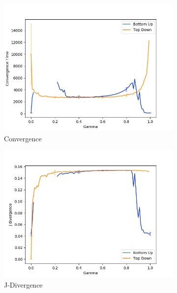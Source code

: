 \begin{figure}[H]
 \centering
  \begin{subfigure}[ht]{0.45\textwidth}
    \includegraphics[width=\textwidth]{Images/Figures/BU+TD/Spiteful/Convergence.png}
    \caption{Convergence}
 \end{subfigure}
 \hfill
 \begin{subfigure}[ht]{0.45\textwidth}
    \includegraphics[width=\textwidth]{Images/Figures/BU+TD/Spiteful/J-Div.png}
    \caption{J-Divergence}
 \end{subfigure}
 \hfill
 \begin{subfigure}[ht]{0.45\textwidth}

\end{subfigure}
\end{figure}
